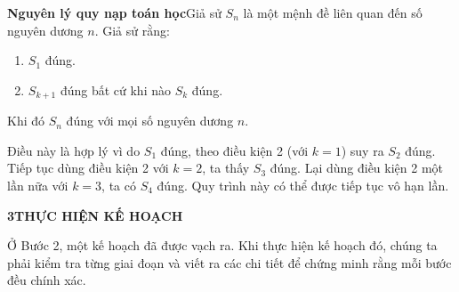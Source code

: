 \begin{minipage}[t]{0.71\textwidth}
    \vspace{0.2cm}
    \begin{tcolorbox}[
        colback=white,
        colframe=stewartred,
        arc=1mm,
        boxrule=0.8pt,
        top=2.5mm, bottom=2.5mm, left=3.5mm, right=3.5mm
    ]
        \textbf{\textsf{\color{stewartred}Nguyên lý quy nạp toán học}}\quad Giả sử $S_n$ là một mệnh đề liên quan đến số nguyên dương $n$. Giả sử rằng:
        \begin{enumerate}\setlength{\itemsep}{1pt}\setlength{\parskip}{0pt}\setlength{\topsep}{2pt}
            \item[\textbf{1.}] $S_1$ đúng.
            \item[\textbf{2.}] $S_{k+1}$ đúng bất cứ khi nào $S_k$ đúng.
        \end{enumerate}
        \vspace{1pt}
        \noindent Khi đó $S_n$ đúng với mọi số nguyên dương $n$.
    \end{tcolorbox}
    \vspace{0.15cm}

    \noindent Điều này là hợp lý vì do $S_1$ đúng, theo điều kiện 2 (với $k = 1$) suy ra $S_2$ đúng. Tiếp tục dùng điều kiện 2 với $k = 2$, ta thấy $S_3$ đúng. Lại dùng điều kiện 2 một lần nữa với $k = 3$, ta có $S_4$ đúng. Quy trình này có thể được tiếp tục vô hạn lần.
\end{minipage}

\vspace{0.35cm}

\noindent
\begin{minipage}[t]{0.26\textwidth}
    \vspace{0pt}%
    \begin{tcolorbox}[
        nobeforeafter,
        colback=stewartpurple!15,
        colframe=stewartpurple!15,
        arc=0mm,
        top=1.2mm, bottom=1.2mm, left=2mm, right=2mm,
        boxrule=0pt
    ]
        \textbf{\textsf{\color{stewartpurple}3\quad THỰC HIỆN KẾ HOẠCH}}
    \end{tcolorbox}
\end{minipage}%
\hfill
\begin{minipage}[t]{0.71\textwidth}
    \vspace{0pt}%
    \noindent Ở Bước 2, một kế hoạch đã được vạch ra. Khi thực hiện kế hoạch đó, chúng ta phải kiểm tra từng giai đoạn và viết ra các chi tiết để chứng minh rằng mỗi bước đều chính xác.
\end{minipage}

